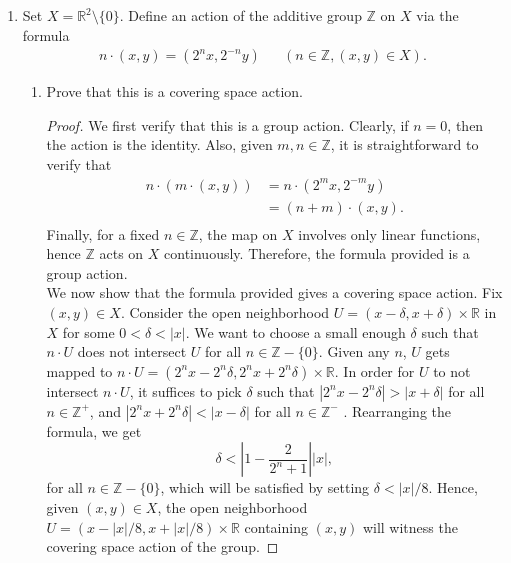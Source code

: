\documentclass{article}
\begin{document}
\begin{enumerate}
  \item Set $X=\mathbb{R}^2\setminus\{0\}$. Define an action of the
    additive group $\mathbb{Z}$ on $X$ via the formula
    \begin{align*}
      n\cdot(x,y) = (2^nx,2^{-n}y)  &&  (n\in\mathbb{Z},(x,y)\in X).
    \end{align*}

    \begin{enumerate}
      \item Prove that this is a covering space action.
        \begin{proof}
          We first verify that this is a group action. Clearly, if $n=0$,
          then the action is the identity. Also, given $m,n\in\mathbb{Z}$,
          it is straightforward to verify that
          \begin{align*}
            n\cdot(m\cdot(x,y)) &= n\cdot(2^mx,2^{-m}y) \\
                                &= (n+m)\cdot(x,y). \\
          \end{align*}
          Finally, for a fixed $n\in\mathbb{Z}$, the map on $X$ involves
          only linear functions, hence $\mathbb{Z}$ acts on $X$
          continuously. Therefore, the formula provided is a group action.
          \\

          We now show that the formula provided gives a covering space
          action. Fix $(x,y)\in X$. Consider the open neighborhood
          $U=(x-\delta,x+\delta)\times\mathbb{R}$ in $X$ for some
          $0<\delta<|x|$. We want to choose a small enough $\delta$ such
          that $n\cdot U$ does not intersect $U$ for all
          $n\in\mathbb{Z}-\{0\}$. Given any $n$, $U$ gets mapped to
          $n\cdot U=(2^nx-2^n\delta,2^nx+2^n\delta)\times\mathbb{R}$. In
          order for $U$ to not intersect $n\cdot U$, it suffices to pick
          $\delta$ such that $|2^nx-2^n\delta|>|x+\delta|$ for all
          $n\in\mathbb{Z}^+$, and $|2^nx+2^n\delta|<|x-\delta|$ for all
          $n\in\mathbb{Z}^-$ . Rearranging the formula, we get
          \begin{equation*}
            \delta < \left|1-\frac{2}{2^n+1}\right||x|,
          \end{equation*}
          for all $n\in\mathbb{Z}-\{0\}$, which will be satisfied by
          setting $\delta<|x|/8$. Hence, given $(x,y)\in X$, the open
          neighborhood $U=(x-|x|/8,x+|x|/8)\times\mathbb{R}$ containing
          $(x,y)$ will witness the covering space action of the group.
        \end{proof}


\end{enumerate}
\end{enumerate}
\end{document}
